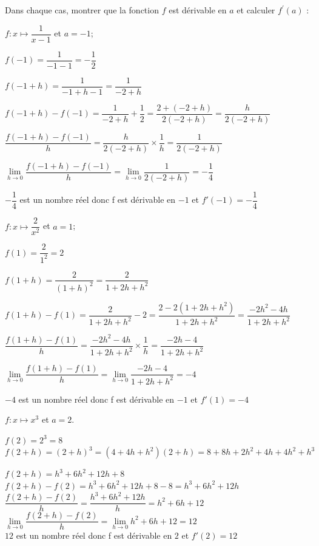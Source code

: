 \documentclass[12pt,a4paper]{article}  %
\begin{document}
Dans chaque cas, montrer que la fonction $f$ est dérivable en $a$ et calculer $f^{\prime}(a)$ :
\begin{enumMet}
	\item $f: x \mapsto \dfrac{1}{x-1}$ et $a=-1$;
	\begin{corrBox}
		$f(-1)=\dfrac{1}{-1-1}=-\dfrac{1}{2}$
		
		$f(-1+h)=\dfrac{1}{-1+h-1}=\dfrac{1}{-2+h}$
		
		$f(-1+h)-f(-1)=\dfrac{1}{-2+h}+\dfrac{1}{2}=\dfrac{2+(-2+h)}{2(-2+h)}=\dfrac{h}{2(-2+h)}$
		
		$\dfrac{f(-1+h)-f(-1)}{h}=\dfrac{h}{2(-2+h)}\times \dfrac{1}{h}=\dfrac{1}{2(-2+h)}$
		
		$\lim \limits_{h \rightarrow 0} \dfrac{f(-1+h)-f(-1)}{h}=\lim \limits_{h \rightarrow 0} \dfrac{1}{2(-2+h)}=-\dfrac{1}{4}$
		
		$-\dfrac{1}{4}$ est un nombre réel donc f est dérivable en $-1$ et $f'(-1)=-\dfrac{1}{4}$		
	\end{corrBox}
	\item $f: x \mapsto \dfrac{2}{x^2}$ et $a=1$;
	\begin{corrBox}
		$f(1)=\dfrac{2}{1^2}=2$
		
		$f(1+h)=\dfrac{2}{(1+h)^2}=\dfrac{2}{1+2h+h^2}$
		
		$f(1+h)-f(1)=\dfrac{2}{1+2h+h^2}-2=\dfrac{2-2(1+2h+h^2)}{1+2h+h^2}=\dfrac{-2h^2-4h}{1+2h+h^2}$
		
		$\dfrac{f(1+h)-f(1)}{h}=\dfrac{-2h^2-4h}{1+2h+h^2}\times \dfrac{1}{h}=\dfrac{-2h-4}{1+2h+h^2}$
		
		$\lim \limits_{h \rightarrow 0} \dfrac{f(1+h)-f(1)}{h}=\lim \limits_{h \rightarrow 0} \dfrac{-2h-4}{1+2h+h^2}=-4$
		
		$-4$ est un nombre réel donc f est dérivable en $-1$ et $f'(1)=-4$		
	\end{corrBox}
	\newpage
	\item $f: x \mapsto x^3$ et $a=2$.
	\begin{corrBox}
		$f(2)=2^3=8$
		\ \\
		
		$f(2+h)=(2+h)^3=(4+4h+h^2)(2+h)=8+8h+2h^2+4h+4h^2+h^3$
		
		$f(2+h)=h^3+6h^2+12h+8$
		\ \\
		
		$f(2+h)-f(2)=h^3+6h^2+12h+8-8 = h^3+6h^2+12h$
		\ \\
		
		$\dfrac{f(2+h)-f(2)}{h}=\dfrac{h^3+6h^2+12h}{h}=h^2+6h+12$
		\ \\
		
		$\lim \limits_{h \rightarrow 0} \dfrac{f(2+h)-f(2)}{h}=\lim \limits_{h \rightarrow 0} h^2+6h+12=12$
		\ \\
		
		$12$ est un nombre réel donc f est dérivable en $2$ et $f'(2)=12$		
	\end{corrBox}
\end{enumMet}
\end{document}
